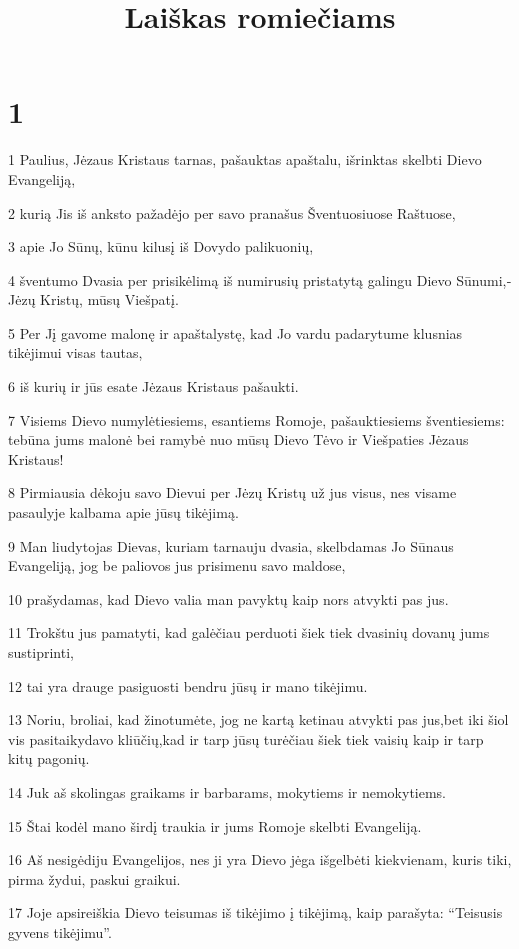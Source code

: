 

\title{Laiškas romiečiams}

\chapter{1}


\par 1 Paulius, Jėzaus Kristaus tarnas, pašauktas apaštalu, išrinktas skelbti Dievo Evangeliją, 
\par 2 kurią Jis iš anksto pažadėjo per savo pranašus Šventuosiuose Raštuose, 
\par 3 apie Jo Sūnų, kūnu kilusį iš Dovydo palikuonių, 
\par 4 šventumo Dvasia per prisikėlimą iš numirusių pristatytą galingu Dievo Sūnumi,­Jėzų Kristų, mūsų Viešpatį. 
\par 5 Per Jį gavome malonę ir apaštalystę, kad Jo vardu padarytume klusnias tikėjimui visas tautas, 
\par 6 iš kurių ir jūs esate Jėzaus Kristaus pašaukti. 
\par 7 Visiems Dievo numylėtiesiems, esantiems Romoje, pašauktiesiems šventiesiems: tebūna jums malonė bei ramybė nuo mūsų Dievo Tėvo ir Viešpaties Jėzaus Kristaus! 
\par 8 Pirmiausia dėkoju savo Dievui per Jėzų Kristų už jus visus, nes visame pasaulyje kalbama apie jūsų tikėjimą. 
\par 9 Man liudytojas Dievas, kuriam tarnauju dvasia, skelbdamas Jo Sūnaus Evangeliją, jog be paliovos jus prisimenu savo maldose, 
\par 10 prašydamas, kad Dievo valia man pavyktų kaip nors atvykti pas jus. 
\par 11 Trokštu jus pamatyti, kad galėčiau perduoti šiek tiek dvasinių dovanų jums sustiprinti, 
\par 12 tai yra drauge pasiguosti bendru jūsų ir mano tikėjimu. 
\par 13 Noriu, broliai, kad žinotumėte, jog ne kartą ketinau atvykti pas jus,­bet iki šiol vis pasitaikydavo kliūčių,­kad ir tarp jūsų turėčiau šiek tiek vaisių kaip ir tarp kitų pagonių. 
\par 14 Juk aš skolingas graikams ir barbarams, mokytiems ir nemokytiems. 
\par 15 Štai kodėl mano širdį traukia ir jums Romoje skelbti Evangeliją. 
\par 16 Aš nesigėdiju Evangelijos, nes ji yra Dievo jėga išgelbėti kiekvienam, kuris tiki, pirma žydui, paskui graikui. 
\par 17 Joje apsireiškia Dievo teisumas iš tikėjimo į tikėjimą, kaip parašyta: “Teisusis gyvens tikėjimu”. 
